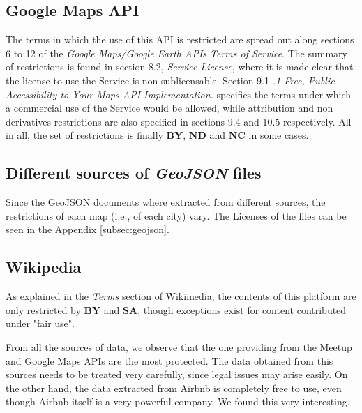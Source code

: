 \subsection*{Google Maps API}

The terms in which the use of this API is restricted are spread out along sections 6 to 12 of the \textit{Google Maps/Google Earth APIs Terms of Service}. The summary of restrictions is found in section 8.2, \textit{Service License}, where it is made clear that the license to use the Service is non-sublicensable. Section 9.1 \textit{.1 Free, Public Accessibility to Your Maps API Implementation.} specifies the terms under which a commercial use of the Service would be allowed, while attribution and non derivatives restrictions are also specified in sections 9.4 and 10.5 respectively. All in all, the set of restrictions is finally  \textbf{BY}, \textbf{ND} and \textbf{NC} in some cases.

\subsection*{Different sources of \textit{GeoJSON} files}

Since the GeoJSON documents where extracted from different sources, the restrictions of each map (i.e., of each city) vary. The Licenses of the files can be seen in the Appendix \ref{subsec:geojson}.


\subsection*{Wikipedia}

As explained in the \textit{Terms} section of Wikimedia, the contents of this platform are only restricted by \textbf{BY} and \textbf{SA}, though exceptions exist for content contributed under "fair use".

\vspace{.75cm}

From all the sources of data, we observe that the one providing from the Meetup and Google Maps APIs are the most protected. The data obtained from this sources needs to be treated very carefully, since legal issues may arise easily. On the other hand, the data extracted from Airbnb is completely free to use, even though Airbnb itself is a very powerful company. We found this very interesting. 